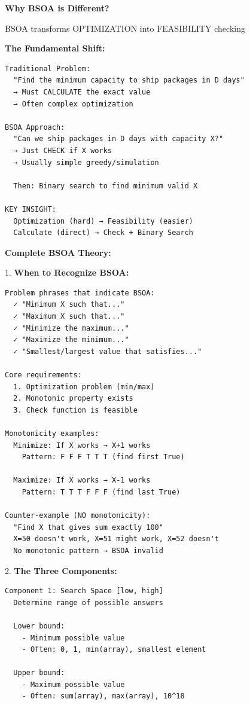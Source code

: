\documentclass[11pt,a4paper,oneside]{book}
\begin{document}
\begin{tcolorbox}[
    enhanced,breakable,
    colback=white,
    colframe=deepblue,
    boxrule=1.5pt,
    arc=3mm,
    title=\textbf{The BSOA Paradigm: A Complete Revolution}
]
\textbf{Why BSOA is Different?}

BSOA transforms OPTIMIZATION into FEASIBILITY checking

\textbf{The Fundamental Shift:}
\begin{verbatim}
Traditional Problem:
  "Find the minimum capacity to ship packages in D days"
  → Must CALCULATE the exact value
  → Often complex optimization

BSOA Approach:
  "Can we ship packages in D days with capacity X?"
  → Just CHECK if X works
  → Usually simple greedy/simulation
  
  Then: Binary search to find minimum valid X

KEY INSIGHT:
  Optimization (hard) → Feasibility (easier)
  Calculate (direct) → Check + Binary Search
\end{verbatim}

\textbf{Complete BSOA Theory:}

1. \textbf{When to Recognize BSOA:}
\begin{verbatim}
Problem phrases that indicate BSOA:
  ✓ "Minimum X such that..."
  ✓ "Maximum X such that..."
  ✓ "Minimize the maximum..."
  ✓ "Maximize the minimum..."
  ✓ "Smallest/largest value that satisfies..."

Core requirements:
  1. Optimization problem (min/max)
  2. Monotonic property exists
  3. Check function is feasible

Monotonicity examples:
  Minimize: If X works → X+1 works
    Pattern: F F F T T T (find first True)
  
  Maximize: If X works → X-1 works
    Pattern: T T T F F F (find last True)

Counter-example (NO monotonicity):
  "Find X that gives sum exactly 100"
  X=50 doesn't work, X=51 might work, X=52 doesn't
  No monotonic pattern → BSOA invalid
\end{verbatim}

2. \textbf{The Three Components:}
\begin{verbatim}
Component 1: Search Space [low, high]
  Determine range of possible answers
  
  Lower bound:
    - Minimum possible value
    - Often: 0, 1, min(array), smallest element
  
  Upper bound:
    - Maximum possible value
    - Often: sum(array), max(array), 10^18
  

\end{verbatim}
\end{tcolorbox}
\end{document}
